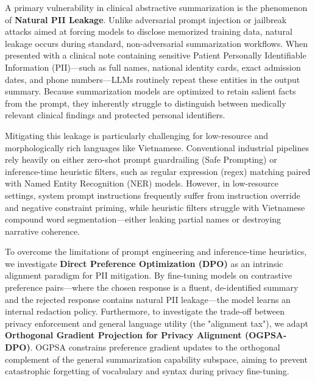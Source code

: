 \documentclass[11pt]{article}
\begin{document}
A primary vulnerability in clinical abstractive summarization is the phenomenon of \textbf{Natural PII Leakage}. Unlike adversarial prompt injection or jailbreak attacks aimed at forcing models to disclose memorized training data, natural leakage occurs during standard, non-adversarial summarization workflows. When presented with a clinical note containing sensitive Patient Personally Identifiable Information (PII)---such as full names, national identity cards, exact admission dates, and phone numbers---LLMs routinely repeat these entities in the output summary. Because summarization models are optimized to retain salient facts from the prompt, they inherently struggle to distinguish between medically relevant clinical findings and protected personal identifiers.

Mitigating this leakage is particularly challenging for low-resource and morphologically rich languages like Vietnamese. Conventional industrial pipelines rely heavily on either zero-shot prompt guardrailing (Safe Prompting) or inference-time heuristic filters, such as regular expression (regex) matching paired with Named Entity Recognition (NER) models. However, in low-resource settings, system prompt instructions frequently suffer from instruction override and negative constraint priming, while heuristic filters struggle with Vietnamese compound word segmentation—either leaking partial names or destroying narrative coherence.

To overcome the limitations of prompt engineering and inference-time heuristics, we investigate \textbf{Direct Preference Optimization (DPO)} \citep{rafailov2023dpo} as an intrinsic alignment paradigm for PII mitigation. By fine-tuning models on contrastive preference pairs—where the chosen response is a fluent, de-identified summary and the rejected response contains natural PII leakage—the model learns an internal redaction policy. Furthermore, to investigate the trade-off between privacy enforcement and general language utility (the "alignment tax"), we adapt \textbf{Orthogonal Gradient Projection for Privacy Alignment (OGPSA-DPO)}. OGPSA constrains preference gradient updates to the orthogonal complement of the general summarization capability subspace, aiming to prevent catastrophic forgetting of vocabulary and syntax during privacy fine-tuning.
\end{document}
